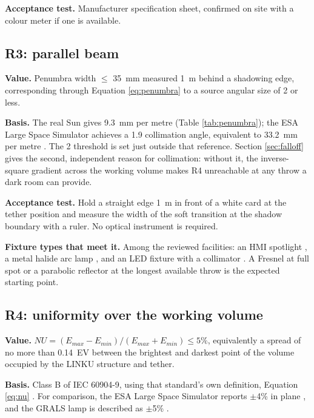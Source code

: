 \textbf{Acceptance test.} Manufacturer specification sheet, confirmed on site with a colour meter if one is available.

\subsection{R3: parallel beam}
\label{sec:r3}

\textbf{Value.} Penumbra width $\leq$ 35~mm measured 1~m behind a shadowing edge, corresponding through Equation \ref{eq:penumbra} to a source angular size of 2\textdegree{} or less.

\textbf{Basis.} The real Sun gives 9.3~mm per metre (Table \ref{tab:penumbra}); the ESA Large Space Simulator achieves a 1.9\textdegree{} collimation angle, equivalent to 33.2~mm per metre \cite{esa_lss}. The 2\textdegree{} threshold is set just outside that reference. Section \ref{sec:falloff} gives the second, independent reason for collimation: without it, the inverse-square gradient across the working volume makes R4 unreachable at any throw a dark room can provide.

\textbf{Acceptance test.} Hold a straight edge 1~m in front of a white card at the tether position and measure the width of the soft transition at the shadow boundary with a ruler. No optical instrument is required.

\textbf{Fixture types that meet it.} Among the reviewed facilities: an HMI spotlight \cite{benninghoff2017epos}, a metal halide arc lamp \cite{park2021tron}, and an LED fixture with a collimator \cite{pauly2022spacelab}. A Fresnel at full spot or a parabolic reflector at the longest available throw is the expected starting point.

\subsection{R4: uniformity over the working volume}
\label{sec:r4}

\textbf{Value.} $NU = (E_{max}-E_{min})/(E_{max}+E_{min}) \leq 5\%$, equivalently a spread of no more than 0.14~EV between the brightest and darkest point of the volume occupied by the LINKU structure and tether.

\textbf{Basis.} Class B of IEC 60904-9, using that standard's own definition, Equation \ref{eq:nu} \cite{iec60904_9_2020}. For comparison, the ESA Large Space Simulator reports $\pm$4\% in plane \cite{esa_lss}, and the GRALS lamp is described as $\pm$5\% \cite{pauly2022spacelab}.

